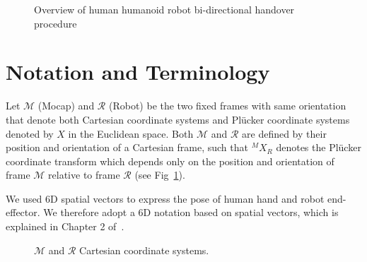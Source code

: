 \begin{figure}[htp]
	\caption{Overview of human humanoid robot bi-directional handover procedure}
\end{figure}



\clearpage
\section{Notation and Terminology}
Let $\mathcal{M}$ (Mocap) and $\mathcal{R}$ (Robot) be the two fixed frames with same orientation that denote both Cartesian coordinate systems and Pl\"ucker coordinate systems denoted by $X$ in the Euclidean space. Both $\mathcal{M}$ and $\mathcal{R}$ are defined by their position and orientation of a Cartesian frame, such that ${}^MX_R$ denotes the Pl\"ucker coordinate transform which depends only on the position and orientation of frame $\mathcal{M}$ relative to frame $\mathcal{R}$ (see Fig~\ref{fig:frames}).

We used 6D spatial vectors to express the pose of human hand and robot end-effector. We therefore adopt a 6D notation based on spatial vectors, which is explained in Chapter 2 of~\cite{featherstone2014rigid}. 


\begin{figure}[ht]
	\caption{$\mathcal{M}$ and $\mathcal{R}$ Cartesian coordinate systems.}
	\label{fig:frames}
\end{figure}


